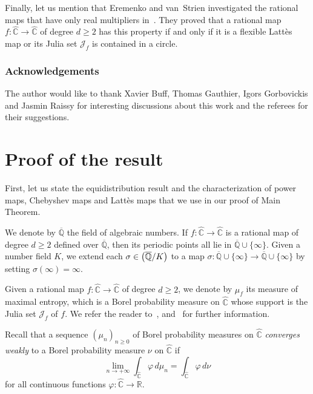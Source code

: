 \documentclass[11pt]{article}
\newcommand{\NoChangel}[1]{%
\expandafter\let\csname old\string#1\endcsname=#1
\let#1=\relax
\newcommand{#1}{\mathcode`l="716C\csname old\string#1\endcsname\mathcode`l="7160 }%
}
\theoremstyle{plain}
\theoremstyle{definition}
\theoremstyle{remark}
\DeclareMathOperator{\Gal}{Gal}\NoChangel{\Gal}
\begin{document}
Finally, let us mention that Eremenko and van~Strien investigated the rational maps that have only real multipliers in~\cite{EvS2011}. They proved that a rational map $f \colon \widehat{\mathbb{C}} \to \widehat{\mathbb{C}}$ of degree $d \geq 2$ has this property if and only if it is a flexible Lattès map or its Julia set $\mathcal{J}_{f}$ is contained in a circle.

\subsubsection*{Acknowledgements}
The author would like to thank Xavier Buff, Thomas Gauthier, Igors Gorbovickis and Jasmin Raissy for interesting discussions about this work and the referees for their suggestions.

\section{Proof of the result}

First, let us state the equidistribution result and the characterization of power maps, Chebyshev maps and Lattès maps that we use in our proof of Main Theorem.

We denote by $\overline{\mathbb{Q}}$ the field of algebraic numbers. If $f \colon \widehat{\mathbb{C}} \to \widehat{\mathbb{C}}$ is a rational map of degree $d \geq 2$ defined over $\overline{\mathbb{Q}}$, then its periodic points all lie in $\overline{\mathbb{Q}} \cup \lbrace \infty \rbrace$. Given a number field $K$, we extend each $\sigma \in \Gal\left(\overline{\mathbb{Q}}/K \right)$ to a map $\sigma \colon \overline{\mathbb{Q}} \cup \lbrace \infty \rbrace \to \overline{\mathbb{Q}} \cup \lbrace \infty \rbrace$ by setting $\sigma(\infty) = \infty$.

Given a rational map $f \colon \widehat{\mathbb{C}} \to \widehat{\mathbb{C}}$ of degree $d \geq 2$, we denote by $\mu_{f}$ its measure of maximal entropy, which is a Borel probability measure on $\widehat{\mathbb{C}}$ whose support is the Julia set $\mathcal{J}_{f}$ of $f$. We refer the reader to~\cite{FLM1983}, \cite{L1983} and~\cite{M1983} for further information.

Recall that a sequence $\left(\mu_{n} \right)_{n \geq 0}$ of Borel probability measures on $\widehat{\mathbb{C}}$ \emph{converges weakly} to a Borel probability measure $\nu$ on $\widehat{\mathbb{C}}$ if
\[
\lim_{n \to +\infty} \int_{\widehat{\mathbb{C}}} \varphi \, d\mu_{n} = \int_{\widehat{\mathbb{C}}} \varphi \, d\nu
\]
for all continuous functions $\varphi \colon \widehat{\mathbb{C}} \to \mathbb{R}$.
\end{document}
